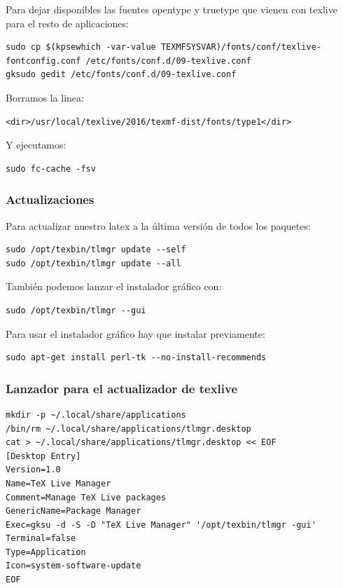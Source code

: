 \documentclass[12pt,spanish,]{article}
\begin{document}
Para dejar disponibles las fuentes opentype y truetype que vienen con
texlive para el resto de aplicaciones:

\begin{verbatim}
sudo cp $(kpsewhich -var-value TEXMFSYSVAR)/fonts/conf/texlive-fontconfig.conf /etc/fonts/conf.d/09-texlive.conf
gksudo gedit /etc/fonts/conf.d/09-texlive.conf
\end{verbatim}

Borramos la linea:

\begin{verbatim}
<dir>/usr/local/texlive/2016/texmf-dist/fonts/type1</dir>
\end{verbatim}

Y ejecutamos:

\begin{verbatim}
sudo fc-cache -fsv
\end{verbatim}

\subsubsection{Actualizaciones}\label{actualizaciones}

Para actualizar nuestro latex a la última versión de todos los paquetes:

\begin{verbatim}
sudo /opt/texbin/tlmgr update --self
sudo /opt/texbin/tlmgr update --all
\end{verbatim}

También podemos lanzar el instalador gráfico con:

\begin{verbatim}
sudo /opt/texbin/tlmgr --gui
\end{verbatim}

Para usar el instalador gráfico hay que instalar previamente:

\begin{verbatim}
sudo apt-get install perl-tk --no-install-recommends
\end{verbatim}

\subsubsection{Lanzador para el actualizador de
texlive}\label{lanzador-para-el-actualizador-de-texlive}

\begin{verbatim}
mkdir -p ~/.local/share/applications
/bin/rm ~/.local/share/applications/tlmgr.desktop
cat > ~/.local/share/applications/tlmgr.desktop << EOF
[Desktop Entry]
Version=1.0
Name=TeX Live Manager
Comment=Manage TeX Live packages
GenericName=Package Manager
Exec=gksu -d -S -D "TeX Live Manager" '/opt/texbin/tlmgr -gui'
Terminal=false
Type=Application
Icon=system-software-update
EOF
\end{verbatim}
\end{document}
